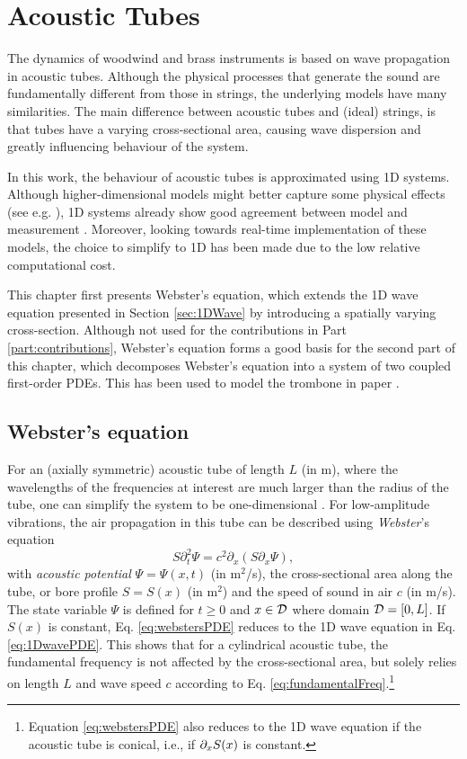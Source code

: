 \chapter{Acoustic Tubes}\label{ch:brass}

The dynamics of woodwind and brass instruments is based on wave propagation in acoustic tubes. Although the physical processes that generate the sound are fundamentally different from those in strings, the underlying models have many similarities. The main difference between acoustic tubes and (ideal) strings, is that tubes have a varying cross-sectional area, causing wave dispersion and greatly influencing behaviour of the system.

In this work, the behaviour of acoustic tubes is approximated using 1D systems. Although higher-dimensional models might better capture some physical effects (see e.g. \cite{Kemp2002}), 1D systems already show good agreement between model and measurement \cite{Eveno2012}. Moreover, looking towards real-time implementation of these models, the choice to simplify to 1D has been made due to the low relative computational cost. 

This chapter first presents Webster's equation, which extends the 1D wave equation presented in Section \ref{sec:1DWave} by introducing a spatially varying cross-section. Although not used for the contributions in Part \ref{part:contributions}, Webster's equation forms a good basis for the second part of this chapter, which decomposes Webster's equation into a system of two coupled first-order PDEs. This has been used to model the trombone in paper \citeP[H].

\section{Webster's equation}\label{sec:webstersEq}
For an (axially symmetric) acoustic tube of length $L$ (in m), where the wavelengths of the frequencies at interest are much larger than the radius of the tube, one can simplify the system to be one-dimensional \cite{Bilbao2018}. For low-amplitude vibrations, the air propagation in this tube can be described using \textit{Webster}'s equation \cite{Webster1919}
\begin{equation}\label{eq:webstersPDE}
    S\partial_t^2\Psi = c^2\partial_x(S\partial_x\Psi),
\end{equation}
with \textit{acoustic potential} $\Psi = \Psi(x,t)$ (in m$^2$/s), the cross-sectional area along the tube, or bore profile $S = S(x)$ (in m$^2$) and the speed of sound in air $c$ (in m/s). The state variable $\Psi$ is defined for $t\geq 0$ and $x \in \mathcal{D}$ where domain $\mathcal{D} = [0, L]$. If $S(x)$ is constant, Eq. \eqref{eq:webstersPDE} reduces to the 1D wave equation in Eq. \eqref{eq:1DwavePDE}. This shows that for a cylindrical acoustic tube, the fundamental frequency is not affected by the cross-sectional area, but solely relies on length $L$ and wave speed $c$ according to Eq. \eqref{eq:fundamentalFreq}.\footnote{Equation \eqref{eq:webstersPDE} also reduces to the 1D wave equation if the acoustic tube is conical, i.e., if $\partial_x S(x)$ is constant.} 

